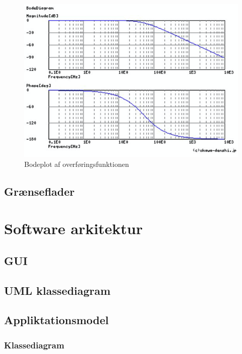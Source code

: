 \begin{figure}[H]
	\centering
	\includegraphics[width=1\textwidth]{Figurer/Hardware/Bodeplot}
	\caption[]{Bodeplot af overføringsfunktionen\footnotemark}
	\label{fig:Bodeplot}
\end{figure}


\subsection{Grænseflader}

\section{Software arkitektur}

\subsection{GUI}

\subsection{UML klassediagram}


\subsection{Appliktationsmodel}

\subsubsection{Klassediagram}

